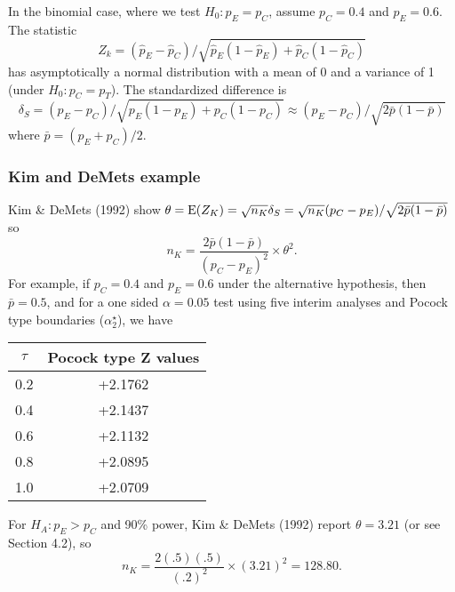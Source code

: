 In the binomial case, where we test $H_0: p_E = p_C$, assume $p_C =
0.4$ and $p_E = 0.6$.  The statistic
\begin{displaymath}
  Z_k = (\hat p_E - \hat p_C) /
        \sqrt{\hat p_E (1-\hat p_E) + \hat p_C (1 - \hat p_C)}
\end{displaymath}
has asymptotically a normal distribution with a mean of 0 and a variance
of 1 (under $H_0: p_C = p_T$).  The standardized difference is
\begin{displaymath}
  \delta_S = (p_E - p_C) / \sqrt{p_E (1-p_E) + p_C (1 - p_C)}
     \approx (p_E - p_C) / \sqrt{2 \bar p (1- \bar p)}
\end{displaymath}
where $\bar p = (p_E + p_C)/2.$

\subsubsection{Kim and DeMets example}

Kim \& DeMets (1992) show
\begin{math}
  \theta = {\rm E} (Z_K)
  = \sqrt{n_K} \delta_S
  = {\sqrt{n_K} (p_C - p_E)}/{\sqrt{2 \bar p (1- \bar p)}}
\end{math}
so
\begin{displaymath}
  n_K = \frac{2 \bar p (1- \bar p)}{(p_C - p_E)^2} \times \theta^2.
\end{displaymath}
For example, if $p_C=0.4$ and $p_E=0.6$ under the alternative hypothesis,
then $\bar p = 0.5$, and for a one sided $\alpha=0.05$ test using five
interim analyses and Pocock type boundaries ($\alpha_2^{\star}$), we have
\begin{center}
\begin{tabular}{cc} \hline
\multicolumn{1}{c}{$\tau$}&
\multicolumn{1}{c}{Pocock type Z values} \\ \hline
 0.2 &  +2.1762  \\
 0.4 &  +2.1437  \\
 0.6 &  +2.1132  \\
 0.8 &  +2.0895  \\
 1.0 &  +2.0709  \\
\hline
\end{tabular}
\end{center}
For $H_A: p_E > p_C$ and 90\% power, Kim \& DeMets (1992) report
$\theta = 3.21$ (or see Section 4.2), so 
\begin{displaymath}
  n_K = \frac{2 (.5)(.5)}{(.2)^2} \times (3.21)^2= 128.80.
\end{displaymath}



